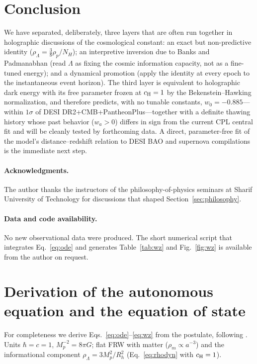 \documentclass[11pt,a4paper]{article}
\begin{document}
\section{Conclusion}
\label{sec:conclusion}

We have separated, deliberately, three layers that are often run together in
holographic discussions of the cosmological constant: an exact but
non-predictive identity ($\rho_\Lambda = \tfrac38 \rho_p/N_H$); an
interpretive inversion due to Banks and Padmanabhan (read $\Lambda$ as fixing
the cosmic information capacity, not as a fine-tuned energy); and a
dynamical promotion (apply the identity at every epoch to the instantaneous
event horizon). The third layer is equivalent to holographic dark energy
with its free parameter frozen at $c_{\rm H}=1$ by the Bekenstein--Hawking
normalization, and therefore predicts, with no tunable constants,
$w_0=-0.885$---within $1\sigma$ of DESI DR2+CMB+PantheonPlus---together with
a definite thawing history whose past behavior ($w_a>0$) differs in sign
from the current CPL central fit and will be cleanly tested by forthcoming
data. A direct, parameter-free fit of the model's distance--redshift
relation to DESI BAO and supernova compilations is the immediate next step.

\paragraph{Acknowledgments.} The author thanks the instructors of the
philosophy-of-physics seminars at Sharif University of Technology for
discussions that shaped Section~\ref{sec:philosophy}.

\paragraph{Data and code availability.} No new observational data were
produced. The short numerical script that integrates Eq.~\eqref{eq:ode} and
generates Table~\ref{tab:wz} and Fig.~\ref{fig:wz} is available from the
author on request.

\appendix

\section{Derivation of the autonomous equation and the equation of state}
\label{app:derivation}

For completeness we derive Eqs.~\eqref{eq:ode}--\eqref{eq:wz} from the
postulate, following \citet{Li2004}. Units $\hbar=c=1$,
$M_p^{-2}=8\pi G$; flat FRW with matter ($\rho_m \propto a^{-3}$) and the
informational component $\rho_\Lambda = 3M_p^2/R_h^2$
(Eq.~\eqref{eq:rhodyn} with $c_{\rm H}=1$).
\end{document}
